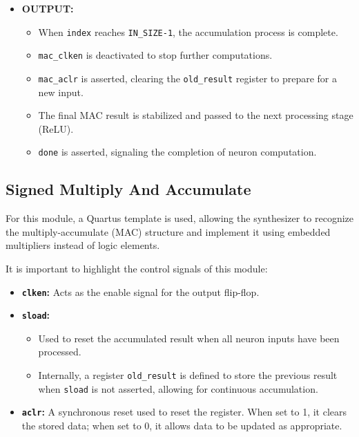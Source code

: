 \documentclass[11pt]{report}
\begin{document}
\begin{itemize}
    \item \textbf{OUTPUT:}  
    \begin{itemize}
        \item When \texttt{index} reaches \texttt{IN\_SIZE-1}, the accumulation process is complete.  
        \item \texttt{mac\_clken} is deactivated to stop further computations.  
        \item \texttt{mac\_aclr} is asserted, clearing the \texttt{old\_result} register to prepare for a new input.  
        \item The final MAC result is stabilized and passed to the next processing stage (ReLU).  
        \item \texttt{done} is asserted, signaling the completion of neuron computation.  
    \end{itemize}
\end{itemize}

\subsection{Signed Multiply And Accumulate}  

For this module, a Quartus template is used, allowing the synthesizer to recognize the multiply-accumulate (MAC) structure and implement it using embedded multipliers instead of logic elements.  

It is important to highlight the control signals of this module:  

\begin{itemize}
    \item \textbf{\texttt{clken}:} Acts as the enable signal for the output flip-flop.  
    \item \textbf{\texttt{sload}:}  
    \begin{itemize}
        \item Used to reset the accumulated result when all neuron inputs have been processed.  
        \item Internally, a register \texttt{old\_result} is defined to store the previous result when \texttt{sload} is not asserted, allowing for continuous accumulation.  
    \end{itemize}
    \item \textbf{\texttt{aclr}:} A synchronous reset used to reset the register. When set to 1, it clears the stored data; when set to 0, it allows data to be updated as appropriate.  
\end{itemize}
 
\end{document}
